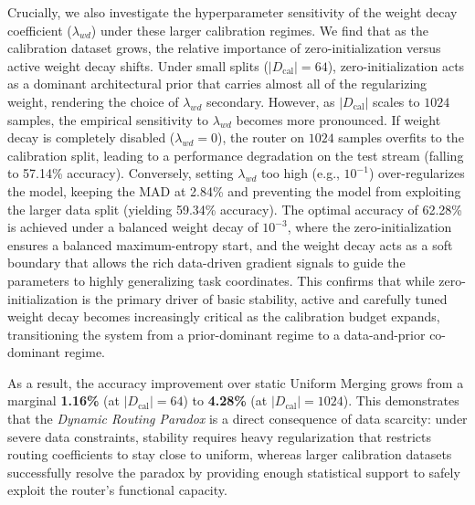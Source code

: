 Crucially, we also investigate the hyperparameter sensitivity of the weight decay coefficient ($\lambda_{wd}$) under these larger calibration regimes. We find that as the calibration dataset grows, the relative importance of zero-initialization versus active weight decay shifts. Under small splits ($|D_{\text{cal}}| = 64$), zero-initialization acts as a dominant architectural prior that carries almost all of the regularizing weight, rendering the choice of $\lambda_{wd}$ secondary. However, as $|D_{\text{cal}}|$ scales to $1024$ samples, the empirical sensitivity to $\lambda_{wd}$ becomes more pronounced. If weight decay is completely disabled ($\lambda_{wd} = 0$), the router on $1024$ samples overfits to the calibration split, leading to a performance degradation on the test stream (falling to 57.14\% accuracy). Conversely, setting $\lambda_{wd}$ too high (e.g., $10^{-1}$) over-regularizes the model, keeping the MAD at 2.84\% and preventing the model from exploiting the larger data split (yielding 59.34\% accuracy). The optimal accuracy of 62.28\% is achieved under a balanced weight decay of $10^{-3}$, where the zero-initialization ensures a balanced maximum-entropy start, and the weight decay acts as a soft boundary that allows the rich data-driven gradient signals to guide the parameters to highly generalizing task coordinates. This confirms that while zero-initialization is the primary driver of basic stability, active and carefully tuned weight decay becomes increasingly critical as the calibration budget expands, transitioning the system from a prior-dominant regime to a data-and-prior co-dominant regime.

As a result, the accuracy improvement over static Uniform Merging grows from a marginal \textbf{1.16\%} (at $|D_{\text{cal}}| = 64$) to \textbf{4.28\%} (at $|D_{\text{cal}}| = 1024$). This demonstrates that the \emph{Dynamic Routing Paradox} is a direct consequence of data scarcity: under severe data constraints, stability requires heavy regularization that restricts routing coefficients to stay close to uniform, whereas larger calibration datasets successfully resolve the paradox by providing enough statistical support to safely exploit the router's functional capacity.

